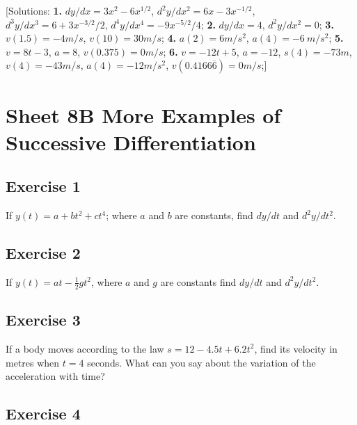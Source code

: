 \documentclass[
  english,
  11pt,
  oneside]{book}
\newcommand{\slide}{}
\theoremstyle{definition}
\theoremstyle{definition}
\theoremstyle{definition}
\theoremstyle{definition}
\theoremstyle{remark}
\begin{document}
{[}Solutions:
\textbf{1.} \(dy/dx=3x^2-6x^{1/2}\), \(d^2y/dx^2=6x-3x^{-1/2}\), \(d^3y/dx^3=6+3x^{-3/2}/2\), \(d^4y/dx^4=-9x^{-5/2}/4\);
\textbf{2.} \(dy/dx=4\), \(d^2y/dx^2=0\);
\textbf{3.} \(v(1.5) = -4m/s\), \(v(10) = 30m/s\);
\textbf{4.} \(a(2) = 6m/s^2\), \(a(4) = -6\ m/s^2\);
\textbf{5.} \(v=8t-3\), \(a=8\), \(v(0.375)=0m/s\);
\textbf{6.} \(v = -12t+5\), \(a=-12\), \(s(4) = -73m\), \(v(4)=-43m/s\), \(a(4)=-12m/s^2\), \(v(0.4166\overline{6})=0m/s\);{]}
\slide

\section{Sheet 8B More Examples of Successive Differentiation}\label{sheet-8b-more-examples-of-successive-differentiation}

\subsection*{Exercise 1}\label{exercise-1-3}

If \(y(t) = a + bt^2 + ct^4\); where \(a\) and \(b\) are constants, find \(dy/dt\) and \(d^2y/dt^2\).

\slide

\subsection*{Exercise 2}\label{exercise-2-3}

If \(y(t) = at -\frac 12gt^2\), where \(a\) and \(g\) are constants find \(dy/dt\) and \(d^2y/dt^2\).

\slide

\subsection*{Exercise 3}\label{exercise-3-2}

If a body moves according to the law \(s = 12 - 4.5t + 6.2t^2\), find its velocity in metres when \(t = 4\) seconds. What can you say about the variation of the acceleration with time?

\slide

\subsection*{Exercise 4}\label{exercise-4-2}
\end{document}

